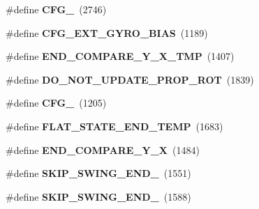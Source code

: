 \begin{DoxyCompactItemize}
\item 
\#define {\bfseries C\+F\+G\+\_}~(2746)\hypertarget{group___d_r_i_v_e_r_s_ga7e9d5deadbd595432b6319178d573cd3}{}\label{group___d_r_i_v_e_r_s_ga7e9d5deadbd595432b6319178d573cd3}

\item 
\#define {\bfseries C\+F\+G\+\_\+\+E\+X\+T\+\_\+\+G\+Y\+R\+O\+\_\+\+B\+I\+AS}~(1189)\hypertarget{group___d_r_i_v_e_r_s_ga63971727875ac02e2ce6632bd3f82bc2}{}\label{group___d_r_i_v_e_r_s_ga63971727875ac02e2ce6632bd3f82bc2}

\item 
\#define {\bfseries E\+N\+D\+\_\+\+C\+O\+M\+P\+A\+R\+E\+\_\+\+Y\+\_\+\+X\+\_\+\+T\+MP}~(1407)\hypertarget{group___d_r_i_v_e_r_s_gae9f800bcc27bb65de184d1dbe9c0ce24}{}\label{group___d_r_i_v_e_r_s_gae9f800bcc27bb65de184d1dbe9c0ce24}

\item 
\#define {\bfseries D\+O\+\_\+\+N\+O\+T\+\_\+\+U\+P\+D\+A\+T\+E\+\_\+\+P\+R\+O\+P\+\_\+\+R\+OT}~(1839)\hypertarget{group___d_r_i_v_e_r_s_gae7f639b1d39b818bc03ba14cf334bf68}{}\label{group___d_r_i_v_e_r_s_gae7f639b1d39b818bc03ba14cf334bf68}

\item 
\#define {\bfseries C\+F\+G\+\_}~(1205)\hypertarget{group___d_r_i_v_e_r_s_gaf07742dc92c885f8f7d59e70683f9257}{}\label{group___d_r_i_v_e_r_s_gaf07742dc92c885f8f7d59e70683f9257}

\item 
\#define {\bfseries F\+L\+A\+T\+\_\+\+S\+T\+A\+T\+E\+\_\+\+E\+N\+D\+\_\+\+T\+E\+MP}~(1683)\hypertarget{group___d_r_i_v_e_r_s_gaba18283a93fa46f0251d4a6131ed2d5d}{}\label{group___d_r_i_v_e_r_s_gaba18283a93fa46f0251d4a6131ed2d5d}

\item 
\#define {\bfseries E\+N\+D\+\_\+\+C\+O\+M\+P\+A\+R\+E\+\_\+\+Y\+\_\+X}~(1484)\hypertarget{group___d_r_i_v_e_r_s_gab843d731bb3863d28961b6a92f302053}{}\label{group___d_r_i_v_e_r_s_gab843d731bb3863d28961b6a92f302053}

\item 
\#define {\bfseries S\+K\+I\+P\+\_\+\+S\+W\+I\+N\+G\+\_\+\+E\+N\+D\+\_}~(1551)\hypertarget{group___d_r_i_v_e_r_s_gae14f280fb2449ecb6dcb8782a8dfd088}{}\label{group___d_r_i_v_e_r_s_gae14f280fb2449ecb6dcb8782a8dfd088}

\item 
\#define {\bfseries S\+K\+I\+P\+\_\+\+S\+W\+I\+N\+G\+\_\+\+E\+N\+D\+\_}~(1588)\hypertarget{group___d_r_i_v_e_r_s_ga17ac0b4bafc904502e30e9c718a83d15}{}\label{group___d_r_i_v_e_r_s_ga17ac0b4bafc904502e30e9c718a83d15}


\end{DoxyCompactItemize}
